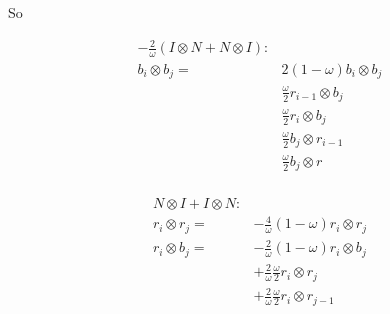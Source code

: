 \documentclass{article}
\begin{document}
So

\begin{align*}
    -\frac{2}{\omega} (I \otimes N + N \otimes I): & \\
    b_i \otimes b_j = & 2(1 - \omega)b_i \otimes b_j           \\
                      & \frac{\omega}{2} r_{i - 1} \otimes b_j \\
                      & \frac{\omega}{2} r_i       \otimes b_j \\
                      & \frac{\omega}{2} b_j \otimes r_{i - 1} \\
                      & \frac{\omega}{2} b_j \otimes r         \\
\end{align*}

\begin{align*}
    N \otimes I + I \otimes N: & \\
    r_i \otimes r_j = & -\frac{4}{\omega}(1 - \omega)r_i \otimes r_j \\
    r_i \otimes b_j = & -\frac{2}{\omega}(1 - \omega)r_i \otimes b_j \\
                      & +\frac{2}{\omega}\frac{\omega}{2} r_i \otimes r_j \\
                      & +\frac{2}{\omega}\frac{\omega}{2} r_i \otimes r_{j - 1} \\
\end{align*}
\end{document}

